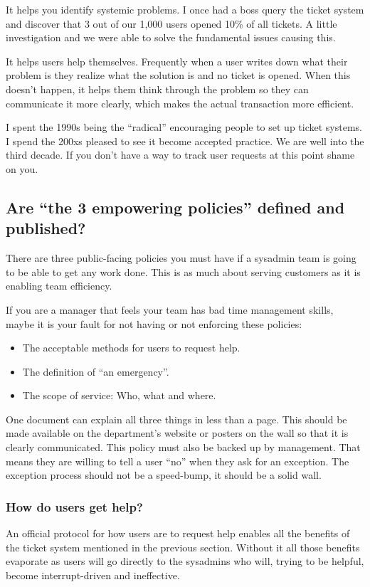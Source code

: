 \documentclass{article}
\begin{document}
It helps you identify systemic problems. I once had a boss query the ticket system and discover that 3 out of our 1,000 users opened 10\% of all tickets. A little investigation and we were able to solve the fundamental issues causing this.

It helps users help themselves. Frequently when a user writes down what their problem is they realize what the solution is and no ticket is opened. When this doesn't happen, it helps them think through the problem so they can communicate it more clearly, which makes the actual transaction more efficient.

I spent the 1990s being the ``radical'' encouraging people to set up ticket systems. I spend the 200xs pleased to see it become accepted practice. We are well into the third decade. If you don't have a way to track user requests at this point shame on you.

\subsection{Are ``the 3 empowering policies'' defined and published?}
There are three public-facing policies you must have if a sysadmin team is going to be able to get any work done. This is as much about serving customers as it is enabling team efficiency.

If you are a manager that feels your team has bad time management skills, maybe it is your fault for not having or not enforcing these policies:

\begin{itemize}
    \item The acceptable methods for users to request help.
    \item The definition of ``an emergency''.
    \item The scope of service: Who, what and where.
\end{itemize}

One document can explain all three things in less than a page. This should be made available on the department's website or posters on the wall so that it is clearly communicated. This policy must also be backed up by management. That means they are willing to tell a user ``no'' when they ask for an exception. The exception process should not be a speed-bump, it should be a solid wall.

\subsubsection*{How do users get help?}
An official protocol for how users are to request help enables all the benefits of the ticket system mentioned in the previous section. Without it all those benefits evaporate as users will go directly to the sysadmins who will, trying to be helpful, become interrupt-driven and ineffective.
\end{document}
